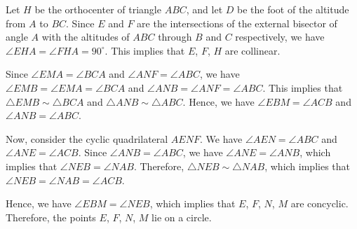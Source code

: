Let \( H \) be the orthocenter of triangle \( ABC \), and let \( D \) be the foot of the altitude from \( A \) to \( BC \).  
Since \( E \) and \( F \) are the intersections of the external bisector of angle \( A \) with the altitudes of \( ABC \) through \( B \) and \( C \) respectively, we have \( \angle EHA = \angle FHA = 90^\circ \).  
This implies that \( E \), \( F \), \( H \) are collinear.  

Since \( \angle EMA = \angle BCA \) and \( \angle ANF = \angle ABC \), we have \( \angle EMB = \angle EMA = \angle BCA \) and \( \angle ANB = \angle ANF = \angle ABC \).  
This implies that \( \triangle EMB \sim \triangle BCA \) and \( \triangle ANB \sim \triangle ABC \).  
Hence, we have \( \angle EBM = \angle ACB \) and \( \angle ANB = \angle ABC \).  

Now, consider the cyclic quadrilateral \( AENF \).  
We have \( \angle AEN = \angle ABC \) and \( \angle ANE = \angle ACB \).  
Since \( \angle ANB = \angle ABC \), we have \( \angle ANE = \angle ANB \), which implies that \( \angle NEB = \angle NAB \).  
Therefore, \( \triangle NEB \sim \triangle NAB \), which implies that \( \angle NEB = \angle NAB = \angle ACB \).  

Hence, we have \( \angle EBM = \angle NEB \), which implies that \( E \), \( F \), \( N \), \( M \) are concyclic.  
Therefore, the points \( E \), \( F \), \( N \), \( M \) lie on a circle.
